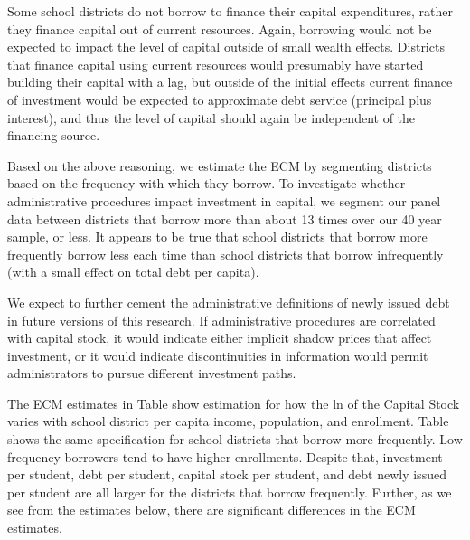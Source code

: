 Some school districts do not borrow to finance their capital expenditures, rather they finance capital out of current resources. Again, borrowing would not be expected to impact the level of capital outside of small wealth effects. Districts that finance capital using current resources would presumably have started building their capital with a lag, but outside of the initial effects current finance of investment would be expected to approximate debt service (principal plus interest), and thus the level of capital should again be independent of the financing source.

Based on the above reasoning, we estimate the ECM by segmenting districts based on the frequency with which they borrow. To investigate whether administrative procedures impact investment in capital, we segment our panel data between districts that borrow more than about 13 times over our 40 year sample, or less. It appears to be true that school districts that borrow more frequently borrow less each time than school districts that borrow infrequently (with a small effect on total debt per capita). 

We expect to further cement the administrative definitions of newly issued debt in future versions of this research. If administrative procedures are correlated with capital stock, it would indicate either implicit shadow prices that affect investment, or it would indicate discontinuities in information would permit administrators to pursue different investment paths.

The ECM estimates in Table show estimation for how the ln of the Capital Stock varies with school district per capita income, population, and enrollment. Table shows the same specification for school districts that borrow more frequently. Low frequency borrowers tend to have higher enrollments. Despite that, investment per student, debt per student, capital stock per student, and debt newly issued per student are all larger for the districts that borrow frequently. Further, as we see from the estimates below, there are significant differences in the ECM estimates.

\begingroup
\singlespacing
\begin{table}[H] %
    \centering
    
\end{table}
\endgroup
 
\begingroup
\singlespacing
\begin{table}[H]
    \centering
    
\end{table}
\endgroup

